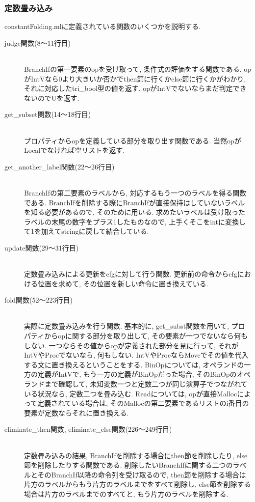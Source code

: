 \documentclass{jarticle}
\begin{document}
\subsubsection{定数畳み込み}
constantFolding.mlに定義されている関数のいくつかを説明する.
\begin{description}
\item[judge関数(8〜11行目)] \leavevmode \\
BranchIfの第一要素のopを受け取って, 条件式の評価をする関数である. opがIntVなら0より大きいか否かでthen節に行くかelse節に行くかがわかり, それに対応したtri\_bool型の値を返す. opがIntVでないならまだ判定できないのでUを返す.
\item[get\_subset関数(14〜18行目)] \leavevmode \\
プロパティからopを定義している部分を取り出す関数である. 当然opがLocalでなければ空リストを返す.
\item[get\_another\_label関数(22〜26行目)] \leavevmode \\
BranchIfの第二要素のラベルから, 対応するもう一つのラベルを得る関数である. BranchIfを削除する際にBranchIfが直接保持はしていないラベルを知る必要があるので, そのために用いる. 求めたいラベルは受け取ったラベルの末尾の数字をプラス1したものなので, 上手くそこをintに変換して1を加えてstringに戻して結合している.
\item[update関数(29〜31行目)] \leavevmode \\
定数畳み込みによる更新をcfgに対して行う関数. 更新前の命令からcfgにおける位置を求めて, その位置を新しい命令に置き換えている.
\item[fold関数(52〜223行目)] \leavevmode \\
実際に定数畳み込みを行う関数. 基本的に, get\_subst関数を用いて, プロパティからopに関する部分を取り出して, その要素が一つでないなら何もしない. 一つならその値からopが定義された部分を見に行って, それがIntVやProcでないなら, 何もしない. IntVやProcならMoveでその値を代入する文に置き換えるということをする. BinOpについては, オペランドの一方の定義がIntVで, もう一方の定義がBinOpだった場合, そのBinOpのオペランドまで確認して, 未知変数一つと定数二つが同じ演算子でつながれている状況なら, 定数二つを畳み込む. Readについては, opが直接Mallocによって定義されている場合は, そのMallocの第二要素であるリストのi番目の要素が定数ならそれに置き換える.
\item[eliminate\_then関数, eliminate\_else関数(226〜249行目)] \leavevmode \\
定数畳み込みの結果, BranchIfを削除する場合にthen節を削除したり, else節を削除したりする関数である. 削除したいBranchIfに関する二つのラベルとそのBranchIf以降の命令列を受け取るので, then節を削除する場合は片方のラベルからもう片方のラベルまでをすべて削除し, else節を削除する場合は片方のラベルまでのすべてと, もう片方のラベルを削除する.

\end{description}
\end{document}
